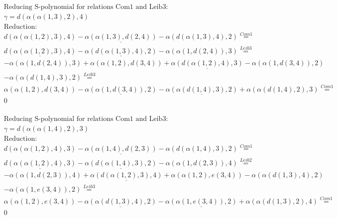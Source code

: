 \documentclass[11pt]{amsart}
\begin{document}
\begin{align*} 
& \text{Reducing S-polynomial for relations Com1 and Leib3:} \\ 
& \gamma = d(\alpha(\alpha(1,3),2),4) \\ 
& \text{Reduction}: \\&d(\alpha(\alpha(1,2),3),4) - \underline{\alpha(\alpha(1,3),d(2,4))} - \alpha(d(\alpha(1,3),4),2) \stackrel{ Com1 }{=}  \\ 
&\underline{d(\alpha(\alpha(1,2),3),4)} - \underline{\alpha(d(\alpha(1,3),4),2)} - \alpha(\alpha(1,d(2,4)),3) \stackrel{ Leib3 }{=}  \\ 
& - \alpha(\alpha(1,d(2,4)),3) + \alpha(\alpha(1,2),d(3,4)) + \underline{\alpha(d(\alpha(1,2),4),3)} - \alpha(\alpha(1,d(3,4)),2)\\ 
 &  - \alpha(\alpha(d(1,4),3),2) \stackrel{ Leib3 }{=}  \\ 
&\alpha(\alpha(1,2),d(3,4)) - \underline{\alpha(\alpha(1,d(3,4)),2)} - \underline{\alpha(\alpha(d(1,4),3),2)} + \alpha(\alpha(d(1,4),2),3) \stackrel{ Com1 }{=}  \\ 
&0\\ 
\end{align*} 
 
\begin{align*} 
& \text{Reducing S-polynomial for relations Com1 and Leib3:} \\ 
& \gamma = d(\alpha(\alpha(1,4),2),3) \\ 
& \text{Reduction}: \\&d(\alpha(\alpha(1,2),4),3) - \underline{\alpha(\alpha(1,4),d(2,3))} - \alpha(d(\alpha(1,4),3),2) \stackrel{ Com1 }{=}  \\ 
&\underline{d(\alpha(\alpha(1,2),4),3)} - \underline{\alpha(d(\alpha(1,4),3),2)} - \alpha(\alpha(1,d(2,3)),4) \stackrel{ Leib2 }{=}  \\ 
& - \alpha(\alpha(1,d(2,3)),4) + \underline{\alpha(d(\alpha(1,2),3),4)} + \alpha(\alpha(1,2),e(3,4)) - \alpha(\alpha(d(1,3),4),2)\\ 
 &  - \alpha(\alpha(1,e(3,4)),2) \stackrel{ Leib3 }{=}  \\ 
&\alpha(\alpha(1,2),e(3,4)) - \underline{\alpha(\alpha(d(1,3),4),2)} - \underline{\alpha(\alpha(1,e(3,4)),2)} + \alpha(\alpha(d(1,3),2),4) \stackrel{ Com1 }{=}  \\ 
&0\\ 
\end{align*} 
 
\end{document}
